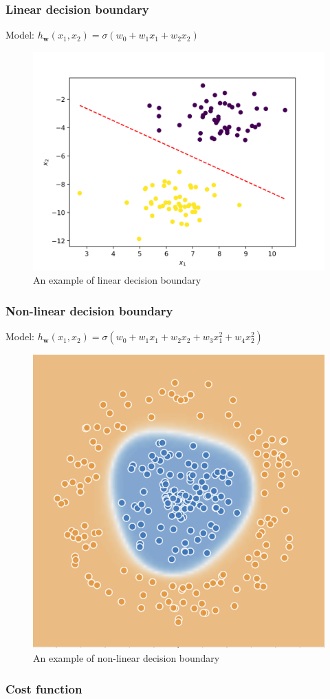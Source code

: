 \documentclass{beamer}
\begin{document}
	\begin{frame}
		\frametitle{Linear decision boundary}
		Model: $h_{\bm{w}}(x_1, x_2) = \sigma(w_0 + w_1 x_1 + w_2 x_2)$
		\begin{figure}
			\centering
			\includegraphics[scale=0.5]{images/linear_decision_boundary}
			\caption{An example of linear decision boundary}
		\end{figure}
	\end{frame}

	\begin{frame}
		\frametitle{Non-linear decision boundary}
		Model: $h_{\bm{w}}(x_1, x_2) = \sigma(w_0 + w_1 x_1 + w_2 x_2 + w_3 x_1^2 + w_4 x_2^2)$
		\begin{figure}
			\centering
			\includegraphics[scale=0.8]{images/non-linear-decision-boundary}
			\caption{An example of non-linear decision boundary}
		\end{figure}
	\end{frame}

	\begin{frame}
		\frametitle{Cost function}
	\end{frame}
\end{document}
